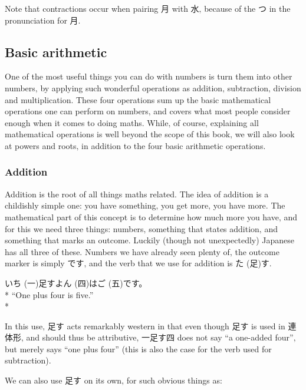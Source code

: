 \documentclass[11pt, b5paper, twoside, openright, onecolumn]{book}
\makeatletter
\newcommand*{\rubystack}[2]{{\relscale{0.5}%
  \begin{tabular}[b]{@{}c@{}}%
    {#1}\\%
   {\textscale{2}{#2}}%
  \end{tabular}}%
}
\DeclareRobustCommand*{\ruby}[2]{%
  \mbox{%
    \setlength{\parskip}{0ex}%
    \BeginAccSupp{method=pdfstringdef,ActualText={#1}}%
      \rubystack{\phantom{#2}}{#1}%
      \llap{%
        \rubystack{#2}{\phantom{#1}}%
      }%
    \EndAccSupp{}%
  }%
}
\renewcommand*{\ruby}[2]{#2 (#1)}%
\newenvironment{exampleblock}{
\setlength{\parindent}{0.6in}
\begin{minipage}[t]{\dimexpr\textwidth-\parindent}}
{\end{minipage}}
\makeatother
\begin{document}
Note that contractions occur when pairing 月 with 水‚ because of the つ in the pronunciation for 月.


\subsection{Basic arithmetic}

One of the most useful things you can do with numbers is turn them into other numbers‚ by applying such wonderful operations as addition‚ subtraction‚ division and multiplication. These four operations sum up the basic mathematical operations one can perform on numbers‚ and covers what most people consider enough when it comes to doing maths. While‚ of course‚ explaining all mathematical operations is well beyond the scope of this book‚ we will also look at powers and roots‚ in addition to the four basic arithmetic operations.

\subsubsection{Addition}

Addition is the root of all things maths related. The idea of addition is a childishly simple one: you have something‚ you get more‚ you have more. The mathematical part of this concept is to determine how much more you have‚ and for this we need three things: numbers‚ something that states addition‚ and something that marks an outcome. Luckily (though not unexpectedly) Japanese has all three of these. Numbers we have already seen plenty of‚ the outcome marker is simply です‚ and the verb that we use for addition is \ruby{足}{た}す.

\vspace{0.4cm}
\begin{exampleblock}
\ruby{一}{いち}足す\ruby{四}{よん}は\ruby{五}{ご}です。 \\* 
“One plus four is five.” \\* 
\end{exampleblock}
\vspace{0.2cm}

In this use‚ 足す acts remarkably western in that even though 足す is used in 連体形‚ and should thus be attributive‚ 一足す四 does not say “a one-added four”‚ but merely says “one plus four” (this is also the case for the verb used for subtraction).

We can also use 足す on its own‚ for such obvious things as:
\end{document}
